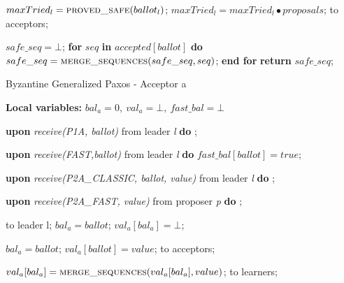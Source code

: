 \begin{algorithm}
\begin{algorithmic}[1]
		\State
		\State $maxTried_l = \Call{proved\_safe}{ballot_l}$;
		\State $maxTried_l = maxTried_l \bullet proposals$;
		\State {} to acceptors;
		\EndFunction
		
		\State
		\State $safe\_seq = \bot$;
		\State \textbf{for} $seq$ \textbf{in} $accepted[ballot]$ \textbf{do}
		\State \hspace{\algorithmicindent} $safe\_seq = \Call{merge\_sequences}{safe\_seq, seq}$;
		\State \textbf{end for}
		\State \textbf{return} $safe\_seq$;
		\EndFunction
	\end{algorithmic}
\end{algorithm}

\begin{algorithm} 
	\caption{Byzantine Generalized Paxos - Acceptor a}
	\label{BFT-Acc}
	\textbf{Local variables:} $bal_a = 0,\ val_a = \bot,\ fast\_bal = \bot$ 
	\begin{algorithmic}[1]
		\State \textbf{upon} \textit{receive(P1A, ballot)} from leader \textit{l} \textbf{do}
		\State \hspace{\algorithmicindent} ;
		
		\State
		\State \textbf{upon} \textit{receive(FAST,ballot)} from leader \textit{l} \textbf{do}
		\State \hspace{\algorithmicindent} $fast\_bal[ballot] = true$;
		
		\State
		\State \textbf{upon} \textit{receive(P2A\_CLASSIC, ballot, value)} from leader \textit{l} \textbf{do}
		\State \hspace{\algorithmicindent} ; 

		\State		
		\State \textbf{upon} \textit{receive(P2A\_FAST, value)} from proposer \textit{p} \textbf{do}
		\State \hspace{\algorithmicindent} ;
				
		\State
		\State {} to leader l;
		\State $bal_a = ballot$;	
		\State $val_a[bal_a] = \bot$;	
		\EndIf
		\EndFunction
	
		\State
		\State $bal_a = ballot$;
		\State $val_a[ballot] = value$;
		\State {} to acceptors;
		\EndIf
		\EndFunction
		
		\State
		\State $val_a[bal_a] =  \Call{merge\_sequences}{val_a[bal_a], value}$;
		\State {} to learners;
		\EndIf
		\EndFunction
	\end{algorithmic}
\end{algorithm}


